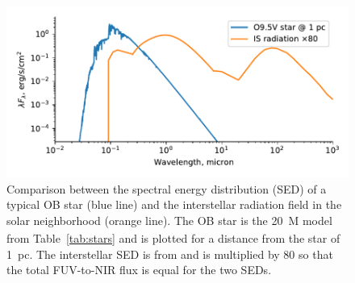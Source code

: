 \begin{figure}
  \centering
  \includegraphics[width=\linewidth]{figs/sed-comparison}
  \caption{Comparison between the spectral energy distribution (SED)
    of a typical OB star (blue line) and the interstellar radiation
    field in the solar neighborhood (orange line).  The OB star is the
    \SI{20}{M_\odot} model from Table~\ref{tab:stars} and is plotted for a
    distance from the star of \SI{1}{pc}.  The interstellar SED is
    from \citet{Mathis:1983a} and is multiplied by \num{80} so that
    the total FUV-to-NIR flux is equal for the two SEDs.}
  \label{fig:sed-comparison}
\end{figure}



